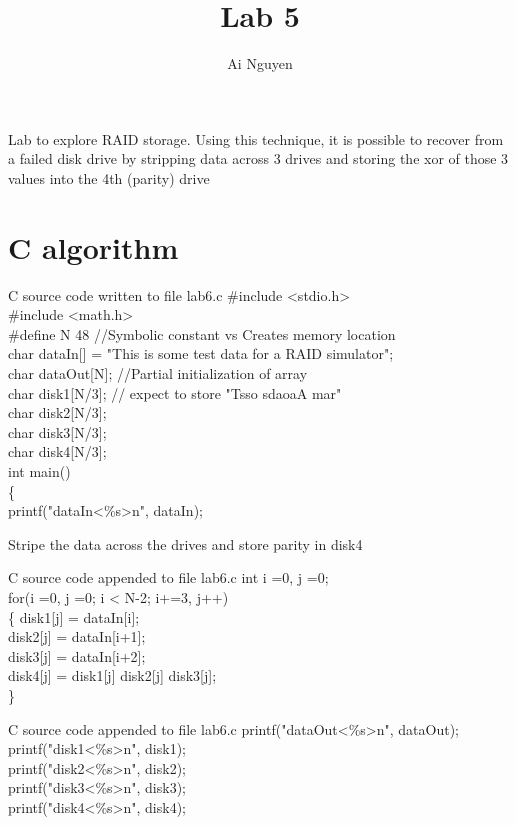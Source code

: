 \documentclass{article}
\begin{document}
\title{Lab 5}
\author{Ai Nguyen}
\maketitle
Lab to explore RAID storage. Using this technique, it is possible to recover from a failed disk drive by stripping data across 3 drives and storing the xor of those 3 values into the 4th (parity) drive \\
\section{C algorithm}
\begin{GFT}{C source code written to file lab6.c}
\+\#include <stdio.h>\\
\+\#include <math.h>\\
\+\#define N 48 //Symbolic constant vs Creates memory location\\
\+char dataIn[] = "This is some test data for a RAID simulator";\\
\+char dataOut[N]; //Partial initialization of array\\
\+char disk1[N/3]; // expect to store "Tsso sdaoaA mar"\\
\+char disk2[N/3];\\
\+char disk3[N/3];\\
\+char disk4[N/3];\\
\+int main()\\
\+\{\\
\+  printf("dataIn<\%s>\Backslash{}n", dataIn);\\
\end{GFT}
\begin{multicols}{2}
Stripe the data across the drives and store parity in disk4
\begin{GFT}{C source code appended to file lab6.c}
\+  int i =0, j =0;\\
\+  for(i =0, j =0; i < N-2; i+=3, j++)\\
\+  \{	disk1[j] = dataIn[i];\\
\+	disk2[j] = dataIn[i+1];\\
\+	disk3[j] = dataIn[i+2];\\
\+	disk4[j] = disk1[j] \Circumflex{} disk2[j] \Circumflex{} disk3[j];\\
\+  \}\\
\end{GFT}
\columnbreak
\begin{GFT}{C source code appended to file lab6.c}
\+  printf("dataOut<\%s>\Backslash{}n", dataOut);\\
\+  printf("disk1<\%s>\Backslash{}n", disk1);\\
\+  printf("disk2<\%s>\Backslash{}n", disk2);\\
\+  printf("disk3<\%s>\Backslash{}n", disk3);\\
\+  printf("disk4<\%s>\Backslash{}n", disk4);\\
\end{GFT}
\end{multicols}
\end{document}
